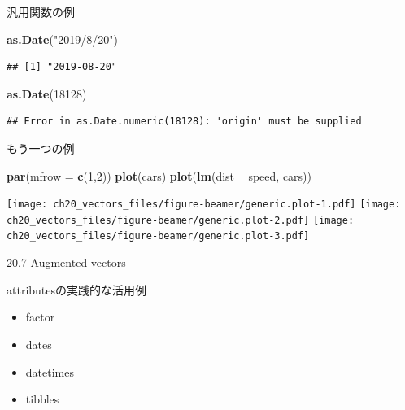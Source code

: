 \documentclass[ignorenonframetext,]{beamer}
\newenvironment{Shaded}{\begin{snugshade}}{\end{snugshade}}
\newcommand{\KeywordTok}[1]{\textcolor[rgb]{0.13,0.29,0.53}{\textbf{#1}}}
\newcommand{\DataTypeTok}[1]{\textcolor[rgb]{0.13,0.29,0.53}{#1}}
\newcommand{\DecValTok}[1]{\textcolor[rgb]{0.00,0.00,0.81}{#1}}
\newcommand{\StringTok}[1]{\textcolor[rgb]{0.31,0.60,0.02}{#1}}
\newcommand{\OperatorTok}[1]{\textcolor[rgb]{0.81,0.36,0.00}{\textbf{#1}}}
\newcommand{\NormalTok}[1]{#1}
\providecommand{\tightlist}{%
  \setlength{\itemsep}{0pt}\setlength{\parskip}{0pt}}
\begin{document}
\begin{frame}[fragile]{汎用関数の例}

\begin{Shaded}
\begin{Highlighting}[]
\KeywordTok{as.Date}\NormalTok{(}\StringTok{"2019/8/20"}\NormalTok{)}
\end{Highlighting}
\end{Shaded}

\begin{verbatim}
## [1] "2019-08-20"
\end{verbatim}

\begin{Shaded}
\begin{Highlighting}[]
\KeywordTok{as.Date}\NormalTok{(}\DecValTok{18128}\NormalTok{)}
\end{Highlighting}
\end{Shaded}

\begin{verbatim}
## Error in as.Date.numeric(18128): 'origin' must be supplied
\end{verbatim}

\end{frame}

\begin{frame}[fragile]{もう一つの例}

\begin{Shaded}
\begin{Highlighting}[]
\KeywordTok{par}\NormalTok{(}\DataTypeTok{mfrow =} \KeywordTok{c}\NormalTok{(}\DecValTok{1}\NormalTok{,}\DecValTok{2}\NormalTok{))}
\KeywordTok{plot}\NormalTok{(cars)}
\KeywordTok{plot}\NormalTok{(}\KeywordTok{lm}\NormalTok{(dist }\OperatorTok{~}\StringTok{ }\NormalTok{speed, cars))}
\end{Highlighting}
\end{Shaded}

\texttt{[image: ch20\_vectors\_files/figure-beamer/generic.plot-1.pdf]}
\texttt{[image: ch20\_vectors\_files/figure-beamer/generic.plot-2.pdf]}
\texttt{[image: ch20\_vectors\_files/figure-beamer/generic.plot-3.pdf]}

\end{frame}

\begin{frame}{20.7 Augmented vectors}

attributesの実践的な活用例

\begin{itemize}
\tightlist
\item
  factor
\item
  dates
\item
  datetimes
\item
  tibbles
\end{itemize}

\end{frame}
\end{document}
